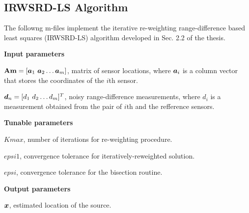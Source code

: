 \subsection{IRWSRD-LS Algorithm}

The followng m-files implement the iterative re-weighting range-difference based least squares (IRWSRD-LS) algorithm developed in Sec. 2.2 of the thesis. 

\phantom{m}

\noindent
\textbf{Input parameters}

\noindent
$\mbox{\textbf{Am}} = [\mbox{\boldmath$a$}_1 \ \mbox{\boldmath$a$}_2 \ldots \mbox{\boldmath$a$}_m]$, matrix of sensor locations, where $\mbox{\boldmath$a$}_i$ is a column vector that stores the coordinates of the $i$th sensor.

\noindent
$\mbox{\boldmath$d$}_n = [d_1 \ d_2 \ldots d_m]^T$, noisy range-difference measurements, where $d_i$ is a measurement obtained from the pair of $i$th and the refference sensors.

\noindent
\textbf{Tunable parameters}

\noindent
$Kmax$, number of iterations for re-weighting procedure.

\noindent
$epsi1$, convergence tolerance for iteratively-reweighted solution.

\noindent
$epsi$, convergence tolerance for the bisection routine.

\noindent
\textbf{Output parameters}

\noindent
$\mbox{\boldmath$x$}$, estimated location of the source.

\phantom{m}

